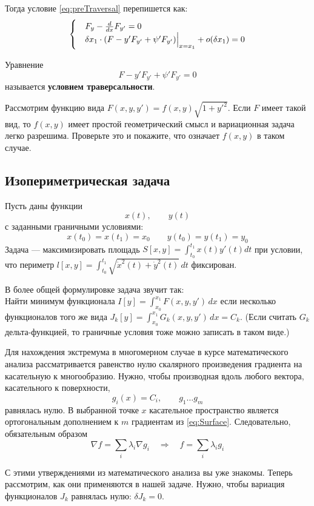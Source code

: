 \documentclass[12pt]{article}
\begin{document}
	Тогда условие \ref{eq:preTraversal} перепишется как:
	$$
	\begin{cases}
		&F_y - \frac{d}{dx} F_{y'} = 0 \\
		&\delta x_1 \cdot (F - y'F_{y'} + \psi' F_{y'})\Big|_{x=x_1}^{} + o(\delta x_1) = 0
	\end{cases} 
	$$
	
	Уравнение
	$$F - y' F_{y'} + \psi' F_{y'} = 0$$
	называется \textbf{условием траверсальности}.
	
	\exc Рассмотрим функцию вида $F(x, y, y') = f(x,y) \sqrt{1+y'^2}$. Если $F$ имеет такой вид, то $f(x,y)$ имеет простой 
	геометрический смысл и вариационная задача легко разрешима. Проверьте это и покажите, что означает $f(x,y)$ в таком
	случае.
	
	\subsection{Изопериметрическая задача}
	Пусть даны функции 
	$$x(t),\qquad y(t)$$
	с заданными граничными условиями:
	$$x(t_0) = x(t_1) = x_0 \qquad y(t_0) = y(t_1) = y_0$$
	Задача --- максимизировать площадь $S[x,y] = \int_{t_0}^{t_1}x(t)y'(t) dt$ при условии, что периметр
	$l[x,y] = \int_{t_0}^{t_1} \sqrt{\dot{x}^2(t) + \dot{y}^2(t)}\,dt$ фиксирован.
	
	В более общей формулировке задача звучит так: \\
	Найти минимум функционала $I[y] = \int_{x_0}^{x_1} F(x,y,y')\,dx$ если несколько функционалов того же вида
	$J_k[y] = \int_{x_0}^{x_1} G_k(x,y,y')\,dx = C_k$. (Если считать $G_k$ дельта-функцией, то граничные условия
	тоже можно записать в таком виде.)
	
	Для нахождения экстремума в многомерном случае в курсе математического анализа рассматривается равенство
	нулю скалярного произведения градиента на касательную к многообразию.
	Нужно, чтобы производная вдоль любого вектора, касательного к поверхности, 
	\begin{equation}g_i(x) = C_i, \qquad g_1\ldots g_m \label{eq:Surface}\end{equation}
	равнялась нулю. В выбранной точке $x$ касательное пространство является ортогональным дополнением
	к $m$ градиентам из \ref{eq:Surface}. Следовательно, обязательным образом
	$$\nabla f = \sum_i \lambda_i \nabla g_i \quad \Rightarrow \quad f = \sum_i \lambda_i g_i$$
	
	С этими утверждениями из математического анализа вы уже знакомы. Теперь рассмотрим, как они применяются в 
	нашей задаче. Нужно, чтобы вариация функционалов $J_k$ равнялась нулю: $\delta J_k = 0$.
	
\end{document}
